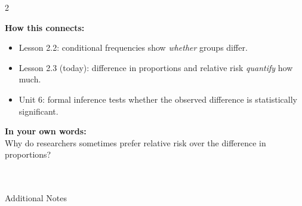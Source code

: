 \documentclass[10pt]{article}
\begin{document}
\begin{spiralbox}
\small
\begin{multicols}{2}

\textbf{How this connects:}
\begin{itemize}[itemsep=3pt]
  \item Lesson 2.2: conditional frequencies show \emph{whether} groups differ.
  \item Lesson 2.3 (today): difference in proportions and relative risk \emph{quantify} how much.
  \item Unit 6: formal inference tests whether the observed difference is statistically significant.
\end{itemize}

\columnbreak

\textbf{In your own words:}\\
Why do researchers sometimes prefer relative risk over the difference in proportions?\\[2pt]
\writeline\\[1pt]\writeline\\[1pt]\writeline

\end{multicols}
\end{spiralbox}

\vspace{0.1in}

\begin{notesbox}{Additional Notes}
\vspace{0pt}
\writeline\\\writeline\\\writeline\\\writeline\\\writeline\\\writeline
\end{notesbox}
\end{document}
